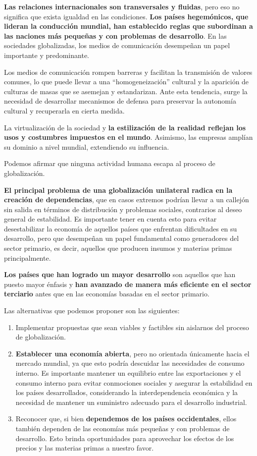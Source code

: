 \documentclass[
  a4paper,
]{article}
\begin{document}
\textbf{Las relaciones internacionales son transversales y fluidas},
pero eso no significa que exista igualdad en las condiciones.
\textbf{Los países hegemónicos, que lideran la conducción mundial, han
establecido reglas que subordinan a las naciones más pequeñas y con
problemas de desarrollo}. En las sociedades globalizadas, los medios de
comunicación desempeñan un papel importante y predominante.

Los medios de comunicación rompen barreras y facilitan la transmisión de
valores comunes, lo que puede llevar a una ``homogeneización'' cultural
y la aparición de culturas de masas que se asemejan y estandarizan. Ante
esta tendencia, surge la necesidad de desarrollar mecanismos de defensa
para preservar la autonomía cultural y recuperarla en cierta medida.

La virtualización de la sociedad y \textbf{la estilización de la
realidad reflejan los usos y costumbres impuestos en el mundo}.
Asimismo, las empresas amplían su dominio a nivel mundial, extendiendo
su influencia.

Podemos afirmar que ninguna actividad humana escapa al proceso de
globalización.

\textbf{El principal problema de una globalización unilateral radica en
la creación de dependencias}, que en casos extremos podrían llevar a un
callejón sin salida en términos de distribución y problemas sociales,
contrarios al deseo general de estabilidad. Es importante tener en
cuenta esto para evitar desestabilizar la economía de aquellos países
que enfrentan dificultades en su desarrollo, pero que desempeñan un
papel fundamental como generadores del sector primario, es decir,
aquellos que producen insumos y materias primas principalmente.

\textbf{Los países que han logrado un mayor desarrollo} son aquellos que
han puesto mayor énfasis y \textbf{han avanzado de manera más eficiente
en el sector terciario} antes que en las economías basadas en el sector
primario.

Las alternativas que podemos proponer son las siguientes:

\begin{enumerate}
\def\labelenumi{\arabic{enumi}.}
\item
  Implementar propuestas que sean viables y factibles sin aislarnos del
  proceso de globalización.
\item
  \textbf{Establecer una economía abierta}, pero no orientada únicamente
  hacia el mercado mundial, ya que esto podría descuidar las necesidades
  de consumo interno. Es importante mantener un equilibrio entre las
  exportaciones y el consumo interno para evitar conmociones sociales y
  asegurar la estabilidad en los países desarrollados, considerando la
  interdependencia económica y la necesidad de mantener un suministro
  adecuado para el desarrollo industrial.
\item
  Reconocer que, si bien \textbf{dependemos de los países occidentales},
  ellos también dependen de las economías más pequeñas y con problemas
  de desarrollo. Esto brinda oportunidades para aprovechar los efectos
  de los precios y las materias primas a nuestro favor.
\end{enumerate}
\end{document}
